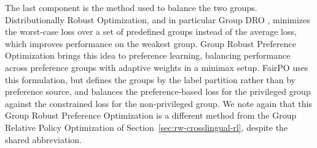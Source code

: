 The last component is the method used to balance the two groups. Distributionally
Robust Optimization, and in particular Group DRO \citep{sagawa2020dro}, minimizes
the worst-case loss over a set of predefined groups instead of the average loss,
which improves performance on the weakest group. Group Robust Preference
Optimization \citep{ramesh2024group} brings this idea to preference learning,
balancing performance across preference groups with adaptive weights in a minimax
setup. FairPO uses this formulation, but defines the groups by the label partition
rather than by preference source, and balances the preference-based loss for the
privileged group against the constrained loss for the non-privileged group. We
note again that this Group Robust Preference Optimization is a different method
from the Group Relative Policy Optimization of
Section~\ref{sec:rw-crosslingual-rl}, despite the shared abbreviation.
